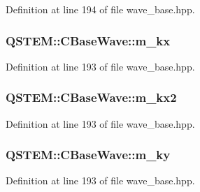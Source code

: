 Definition at line 194 of file wave\-\_\-base.\-hpp.

\hypertarget{class_q_s_t_e_m_1_1_c_base_wave_a44b0e0e6b13efb226ac6bb4c1b29f653}{
\subsubsection[{m\-\_\-kx}]{ Q\-S\-T\-E\-M\-::\-C\-Base\-Wave\-::m\-\_\-kx\hspace{0.3cm}{\ttfamily [protected]}}}\label{class_q_s_t_e_m_1_1_c_base_wave_a44b0e0e6b13efb226ac6bb4c1b29f653}


Definition at line 193 of file wave\-\_\-base.\-hpp.

\hypertarget{class_q_s_t_e_m_1_1_c_base_wave_aa6c02693d70cc30e064b28d94268ba4f}{
\subsubsection[{m\-\_\-kx2}]{ Q\-S\-T\-E\-M\-::\-C\-Base\-Wave\-::m\-\_\-kx2\hspace{0.3cm}{\ttfamily [protected]}}}\label{class_q_s_t_e_m_1_1_c_base_wave_aa6c02693d70cc30e064b28d94268ba4f}


Definition at line 193 of file wave\-\_\-base.\-hpp.

\hypertarget{class_q_s_t_e_m_1_1_c_base_wave_a69548d3b91be0b55b657047b01b5967f}{
\subsubsection[{m\-\_\-ky}]{ Q\-S\-T\-E\-M\-::\-C\-Base\-Wave\-::m\-\_\-ky\hspace{0.3cm}{\ttfamily [protected]}}}\label{class_q_s_t_e_m_1_1_c_base_wave_a69548d3b91be0b55b657047b01b5967f}


Definition at line 193 of file wave\-\_\-base.\-hpp.


